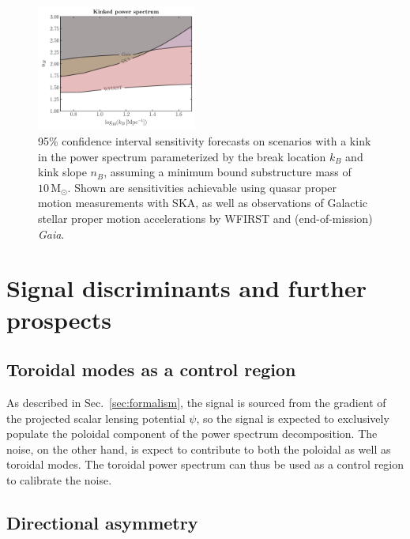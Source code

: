 \documentclass[prd,aps,10pt,nofootinbib,twocolumn,superscriptaddress,preprintnumbers,balancelastpage,longbibliography]{revtex4-1}
\newcommand{\Gaia}{\emph{Gaia}\xspace}
\begin{document}
\begin{figure}[!htbp]
  \centering
  \includegraphics[width=0.47\textwidth]{plots/kink_PS_sig}
  \caption{95\% confidence interval sensitivity forecasts on scenarios with a kink in the power spectrum parameterized by the break location $k_B$ and kink slope $n_B$, assuming a minimum bound substructure mass of $10\,\mathrm M_\odot$. Shown are sensitivities achievable using quasar proper motion measurements with SKA, as well as observations of Galactic stellar proper motion accelerations by WFIRST and (end-of-mission) \Gaia.}
  \label{fig:kink_ps}
\end{figure}

\section{Signal discriminants and further prospects}
\label{sec:handles}

\subsection{Toroidal modes as a control region}

As described in Sec.~\ref{sec:formalism}, the signal is sourced from the gradient of the projected scalar lensing potential $\psi$, so the signal is expected to exclusively populate the poloidal component of the power spectrum decomposition. The noise, on the other hand, is expect to contribute to both the poloidal as well as toroidal modes. The toroidal power spectrum can thus be used as a control region to calibrate the noise.

\subsection{Directional asymmetry}
\end{document}
